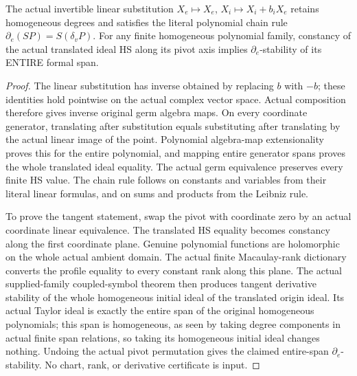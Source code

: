 \begin{theorem}
\label{hir:actual-directional-cone-linear-shear-axis-stability}
\leanok
The actual invertible linear substitution $X_e\mapsto X_e$,
$X_i\mapsto X_i+b_iX_e$ retains homogeneous degrees and satisfies the
literal polynomial chain rule
$\partial_e(SP)=S(\delta_vP)$. For any finite homogeneous polynomial
family, constancy of the actual translated ideal HS along its pivot axis
implies $\partial_e$-stability of its ENTIRE formal span.
\end{theorem}
\begin{proof}
The linear substitution has inverse obtained by replacing $b$ with $-b$;
these identities hold pointwise on the actual complex vector space.
Actual composition therefore gives inverse original germ algebra maps.
On every coordinate generator, translating after substitution equals
substituting after translating by the actual linear image of the point.
Polynomial algebra-map extensionality proves this for the entire
polynomial, and mapping entire generator spans proves the whole translated
ideal equality. The actual germ equivalence preserves every finite HS
value. The chain rule follows on constants and variables from their literal
linear formulas, and on sums and products from the Leibniz rule.

To prove the tangent statement, swap the pivot with coordinate zero by an
actual coordinate linear equivalence. The translated HS equality becomes
constancy along the first coordinate plane. Genuine polynomial functions
are holomorphic on the whole actual ambient domain. The actual finite
Macaulay-rank dictionary converts the profile equality to every constant
rank along this plane. The actual supplied-family coupled-symbol theorem
then produces tangent derivative stability of the whole homogeneous
initial ideal of the translated origin ideal. Its actual Taylor ideal is
exactly the entire span of the original homogeneous polynomials; this span
is homogeneous, as seen by taking degree components in actual finite span
relations, so taking its homogeneous initial ideal changes nothing.
Undoing the actual pivot permutation gives the claimed entire-span
$\partial_e$-stability. No chart, rank, or derivative certificate is input.
\end{proof}

